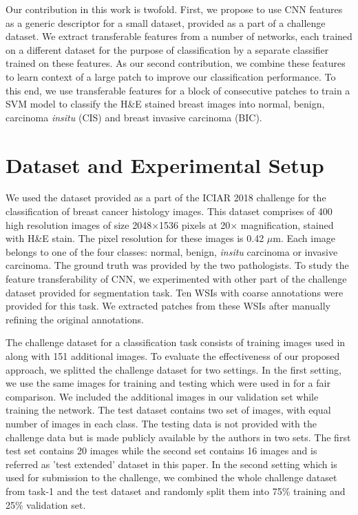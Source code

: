 \documentclass[runningheads,a4paper]{llncs}
\begin{document}
Our contribution in this work is twofold. First, we propose to use CNN features as a generic descriptor for a small dataset, provided as a part of a challenge dataset. We extract transferable features from a number of networks, each trained on a different dataset for the purpose of classification by a separate classifier trained on these features. As our second contribution, we combine these features to learn context of a large patch to improve our classification performance. To this end, we use transferable features for a block of consecutive patches to train a SVM model to classify the H\&E stained breast images into normal, benign, carcinoma \emph{insitu} (CIS) and breast invasive carcinoma (BIC). 


\section{Dataset and Experimental Setup}

We used the dataset provided as a part of the ICIAR 2018 challenge for the classification of breast cancer histology images. This dataset comprises of 400 high resolution images of size 2048$\times$1536 pixels at 20$\times$ magnification, stained with H\&E stain. The pixel resolution for these images is 0.42 $\mu$m. Each image belongs to one of the four classes: normal, benign, \emph{insitu} carcinoma or invasive carcinoma. The ground truth was provided by the two pathologists. To study the feature transferability of CNN, we experimented with other part of the challenge dataset provided for segmentation task. Ten WSIs with coarse annotations were provided for this task. We extracted patches from these WSIs after manually refining the original annotations.

The challenge dataset for a classification task consists of training images used in \cite{araujo2017classification} along with 151 additional images. To evaluate the effectiveness of our proposed approach, we splitted the challenge dataset for two settings. In the first setting, we use the same images for training and testing which were used in \cite{araujo2017classification} for a fair comparison. We included the additional images in our validation set while training the network. The test dataset contains two set of images, with equal number of images in each class. The testing data is not provided with the challenge data but is made publicly available by the authors in two sets. The first test set contains 20 images while the second set contains 16 images and is referred as ’test extended’ dataset in this paper. In the second setting which is used for submission to the challenge, we combined the whole challenge dataset from task-1 and the test dataset and randomly split them into 75\% training and 25\% validation set.
\end{document}

